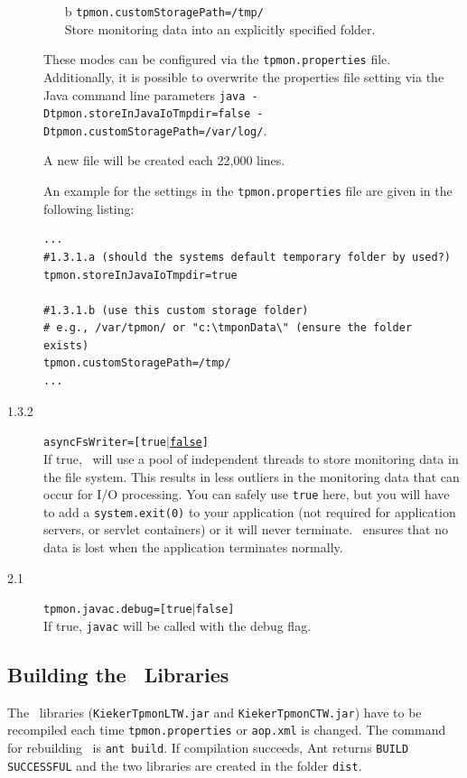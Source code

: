 \documentclass[a4paper,12pt]{scrartcl}
\begin{document}
\begin{description}
\begin{enumerate}
\item [b] \texttt{tpmon.customStoragePath=/tmp/} \\ Store monitoring data into an explicitly specified folder.
\end{enumerate}
These modes can be configured via the \texttt{tpmon.properties} file. Additionally, it is possible to overwrite the properties file setting via the Java command line parameters \footnotesize \texttt{java -Dtpmon.storeInJavaIoTmpdir=false -Dtpmon.customStoragePath=/var/log/}. \normalsize

A new file will be created each 22,000 lines.

An example for the settings in the \texttt{tpmon.properties} file are given in the following listing:
\begin{lstlisting}[caption={Linux/Unix: Specification of the monitoring data storage location}]
...
#1.3.1.a (should the systems default temporary folder by used?)
tpmon.storeInJavaIoTmpdir=true

#1.3.1.b (use this custom storage folder)
# e.g., /var/tpmon/ or "c:\tmponData\" (ensure the folder exists)
tpmon.customStoragePath=/tmp/
...
\end{lstlisting}

\item [1.3.2] \texttt{asyncFsWriter=[true$|$\underline{false}]} \\
If true, \tpmon\ will use a pool of independent threads to store monitoring data in the file system. This results in less outliers in the monitoring data that can occur for I/O processing. You can safely use \texttt{true} here, but you will have to add a \texttt{system.exit(0)} to your application (not required for application servers, or servlet containers) or it will never terminate. \tpmon\ ensures that no data is lost when the application terminates normally.
\item [2.1] \texttt{tpmon.javac.debug=[true$|$\texttt{false}]} \\
If true, \texttt{javac} will be called with the debug flag.
\end{description}

\subsection{Building the \tpmon\ Libraries}
The \tpmon\ libraries (\texttt{KiekerTpmonLTW.jar} and \texttt{KiekerTpmonCTW.jar}) have to be recompiled each time \texttt{tpmon.properties} or \texttt{aop.xml} is changed. The command for rebuilding \tpmon\ is \texttt{ant build}. If compilation succeeds, Ant returns \texttt{BUILD SUCCESSFUL} and the two libraries are created in the folder \texttt{dist}.
\end{document}
